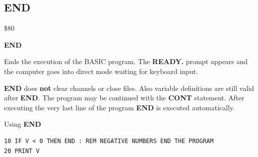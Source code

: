 \newpage
\subsection{END}
\begin{description}[leftmargin=2cm,style=nextline]
\item [Token:] \$80
\item [Format:] {\bf END}
\item [Usage:] Ends the execution
               of the BASIC program. The {\bf READY.} prompt
               appears and the computer goes into direct mode
               waiting for keyboard input.

\item [Remarks:]
               {\bf END} does {\bf not} clear channels or close files.
               Also variable definitions are still valid after {\bf END}.
               The program may be continued with the {\bf CONT}
               statement. After executing the very last line of the
               program {\bf END} is executed automatically.


\item [Example:]
                Using {\bf END}
\begin{tcolorbox}[colback=black,coltext=white]
\verbatimfont{\codefont}
\begin{verbatim}
10 IF V < 0 THEN END : REM NEGATIVE NUMBERS END THE PROGRAM
20 PRINT V
\end{verbatim}
\end{tcolorbox}
\end{description}


\newpage
